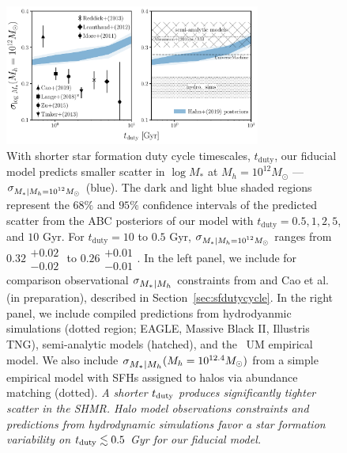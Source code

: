 \documentclass[12pt, letterpaper, preprint, tighten]{aastex62}
\newcommand{\edt}[1]{{\color{dred}{\bf} #1}}
\newcommand{\tduty}{t_{\rm duty}}
\newcommand{\siglogm}{\sigma_{\scaleto{M_*|M_h}{8pt}}}
\newcommand{\sigtwe}{\sigma_{\scaleto{M_*|M_h=10^{12}M_\odot}{8pt}}}
\begin{document}
\begin{figure}
\begin{center}
\includegraphics[width=0.75\textwidth]{figs/SHMRscatter_tduty_v2.pdf}
    \caption{With shorter star formation duty cycle timescales, $t_\mathrm{duty}$,
    our fiducial model predicts smaller scatter in $\log M_*$ at $M_h = 10^{12} M_\odot$ --- $\sigtwe$ (blue). 
    The dark and light blue shaded regions represent the $68\%$ and $95\%$ confidence
    intervals of the predicted scatter from the ABC posteriors of our
    model with $t_\mathrm{duty} = 0.5, 1, 2, 5$, and $10$ Gyr. For $t_\mathrm{duty} = 10$
    to $0.5$ Gyr, $\sigtwe$ ranges from $0.32\substack{+0.02\\ -0.02}$ to
    $0.26\substack{+0.01\\-0.01}$. In the left panel, we include for comparison
    observational $\siglogm$ constraints from \cite{yang2009, more2011, leauthaud2012, zu2015, tinker2017, lange2018a}
    and Cao et al. (in preparation), described in Section~\ref{sec:sfdutycycle}.
    In the right panel, we include compiled predictions from hydrodyanmic simulations
    (dotted region; EAGLE, Massive Black II, Illustris TNG), semi-analytic models (hatched), and
    the~\cite{behroozi2019} {\sc UM} empirical model. We also include 
    $\siglogm(M_h = 10^{12.4} M_\odot)$ from a simple empirical model with \cite{abramson2016} 
    SFHs assigned to halos via abundance matching (dotted).
    \emph{A shorter $\tduty$ produces significantly tighter scatter in the SHMR.
    Halo model observations constraints and predictions from hydrodynamic simulations
    favor a star formation variability on $\tduty \lesssim 0.5$ Gyr for our fiducial
    model.}
    }
\label{fig:sigMstar_duty}
\end{center}
\end{figure}
\end{document}

